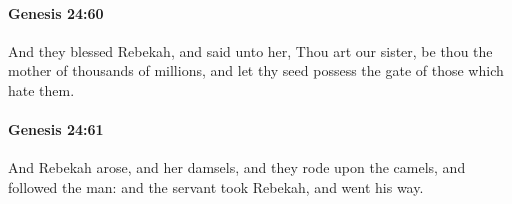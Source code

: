 		\paragraph{Genesis 24:60} %
			\label{GENESIS-24-60}

			And they blessed Rebekah, and said unto her, Thou art our sister, be thou the mother of thousands of millions, and let thy seed possess the gate of those which hate them.


		\paragraph{Genesis 24:61} %
			\label{GENESIS-24-61}

			And Rebekah arose, and her damsels, and they rode upon the camels, and followed the man: and the servant took Rebekah, and went his way.


